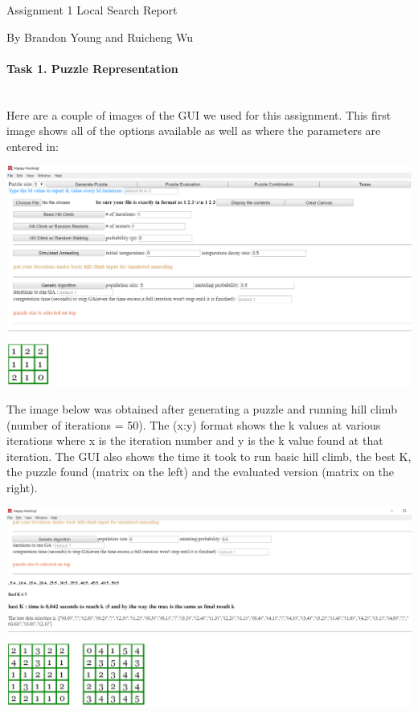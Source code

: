 \documentclass[12pt, letterpaper]{article}
\begin{document}
Assignment 1 Local Search Report

By Brandon Young and Ruicheng Wu

\bigskip

\paragraph{Task 1. Puzzle Representation} \mbox{}\\

Here are a couple of images of the GUI we used for this assignment. This first image shows all of the options available as well as where the parameters are entered in:

\includegraphics[width=\linewidth]{"Task 1/Sample GUI 4"}

The image below was obtained after generating a puzzle and running hill climb (number of iterations = 50). The (x:y) format shows the k values at various iterations where x is the iteration number and y is the k value found at that iteration. The GUI also shows the time it took to run basic hill climb, the best K, the puzzle found (matrix on the left) and the evaluated version (matrix on the right).

\includegraphics[width=\linewidth]{"Task 1/Sample GUI 3"}
\end{document}
